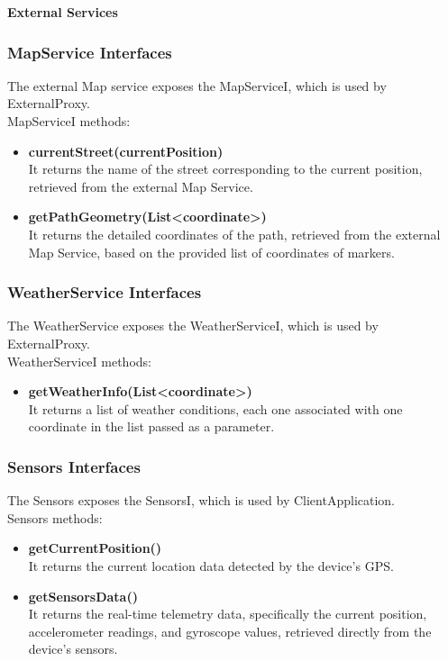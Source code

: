 \vspace{5mm}
\noindent
\textbf{External Services}

\subsubsection{MapService Interfaces}
The external Map service exposes the MapServiceI, which is used by ExternalProxy.\\
MapServiceI methods:
\begin{itemize}
    \item \textbf{currentStreet(currentPosition)}\\
    It returns the name of the street corresponding to the current position, retrieved from the external Map Service.
    \item \textbf{getPathGeometry(List<coordinate>)}\\
    It returns the detailed coordinates of the path, retrieved from the external Map Service, based on the provided list of coordinates of markers.
    
\end{itemize}

\subsubsection{WeatherService Interfaces}
The WeatherService exposes the WeatherServiceI, which is used by ExternalProxy.\\
WeatherServiceI methods:
\begin{itemize}
    \item \textbf{getWeatherInfo(List<coordinate>)}\\
    It returns a list of weather conditions, each one associated with one coordinate in the list passed as a parameter.
\end{itemize}

\subsubsection{Sensors Interfaces}
The Sensors exposes the SensorsI, which is used by ClientApplication.\\
Sensors methods:
\begin{itemize}
    \item \textbf{getCurrentPosition()}\\
    It returns the current location data detected by the device's GPS.
    \item \textbf{getSensorsData()}\\
    It returns the real-time telemetry data, specifically the current position, accelerometer readings, and gyroscope values, retrieved directly from the device's sensors.
\end{itemize}

